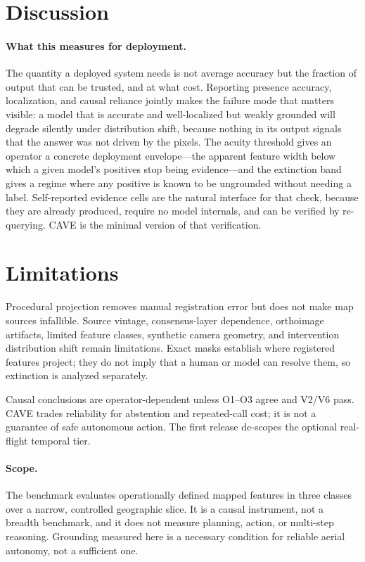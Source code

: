 \section{Discussion}
\paragraph{What this measures for deployment.}
The quantity a deployed system needs is not average accuracy but the fraction of
output that can be trusted, and at what cost. Reporting presence accuracy,
localization, and causal reliance jointly makes the failure mode that matters
visible: a model that is accurate and well-localized but weakly grounded will
degrade silently under distribution shift, because nothing in its output signals
that the answer was not driven by the pixels. The acuity threshold gives an
operator a concrete deployment envelope---the apparent feature width below which
a given model's positives stop being evidence---and the extinction band gives a
regime where any positive is known to be ungrounded without needing a label.
Self-reported evidence cells are the natural interface for that check, because
they are already produced, require no model internals, and can be verified by
re-querying. CAVE is the minimal version of that verification.

\section{Limitations}
Procedural projection removes manual registration error but does not make map
sources infallible. Source vintage, consensus-layer dependence, orthoimage
artifacts, limited feature classes, synthetic camera geometry, and intervention
distribution shift remain limitations. Exact masks establish where registered
features project; they do not imply that a human or model can resolve them, so
extinction is analyzed separately.

Causal conclusions are operator-dependent unless O1--O3 agree and V2/V6 pass.
CAVE trades reliability for abstention and repeated-call cost; it is not a
guarantee of safe autonomous action. The first release de-scopes the optional
real-flight temporal tier.

\paragraph{Scope.} The benchmark evaluates operationally defined mapped features
in three classes over a narrow, controlled geographic slice. It is a causal
instrument, not a breadth benchmark, and it does not measure planning, action, or
multi-step reasoning. Grounding measured here is a necessary condition for
reliable aerial autonomy, not a sufficient one.

